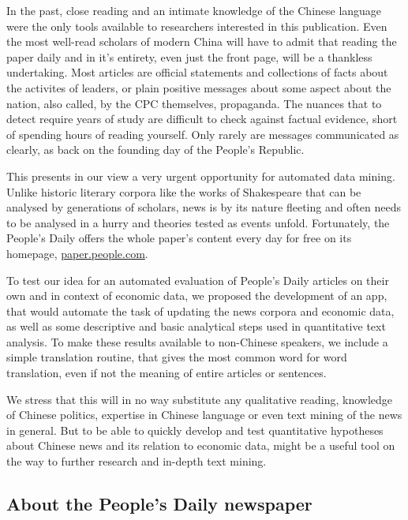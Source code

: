 \documentclass[12pt,a4paper]{article}
\begin{document}
In the past, close reading and an intimate knowledge of the Chinese language were the only tools available to researchers interested in this publication. Even the most well-read scholars of modern China will have to admit that reading the paper daily and in it's entirety, even just the front page, will be a thankless undertaking. Most articles are official statements and collections of facts about the activites of leaders, or plain positive messages about some aspect about the nation, also called, by the CPC themselves, propaganda. The nuances that to detect require years of study are difficult to check against factual evidence, short of spending hours of reading yourself. Only rarely are messages communicated as clearly, as back on the founding day of the People's Republic.

This presents in our view a very urgent opportunity for automated data mining. Unlike historic literary corpora like the works of Shakespeare that can be analysed by generations of scholars, news is by its nature fleeting and often needs to be analysed in a hurry and theories tested as events unfold. Fortunately, the People's Daily offers the whole paper's content every day for free on its homepage, \href{http://paper.people.com.cn/rmrb/}{paper.people.com}.

To test our idea for an automated evaluation of People's Daily articles on their own and in context of economic data, we proposed the development of an app, that would automate the task of updating the news corpora and economic data, as well as some descriptive and basic analytical steps used in quantitative text analysis. To make these results available to non-Chinese speakers, we include a simple translation routine, that gives the most common word for word translation, even if not the meaning of entire articles or sentences.

We stress that this will in no way substitute any qualitative reading, knowledge of Chinese politics, expertise in Chinese language or even text mining of the news in general. But to be able to quickly develop and test quantitative hypotheses about Chinese news and its relation to economic data, might be a useful tool on the way to further research and in-depth text mining.

\hypertarget{about-the-peoples-daily-newspaper}{%
\subsection{About the People's Daily newspaper}\label{about-the-peoples-daily-newspaper}}
\end{document}
